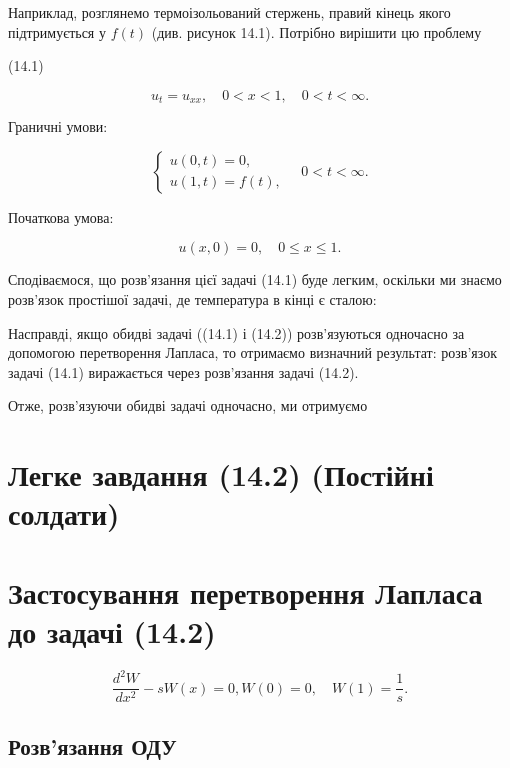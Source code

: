 \documentclass[
  ukrainian,
]{article}
\begin{document}
Наприклад, розглянемо термоізольований стержень, правий кінець якого
підтримується у \(f(t)\) (див. рисунок 14.1). Потрібно вирішити цю
проблему

(14.1)

\[
u_t = u_{xx}, \quad 0 < x < 1, \quad 0 < t < \infty.
\]

Граничні умови:

\[
\begin{cases}
u(0, t) = 0, \\
u(1, t) = f(t),
\end{cases}
\quad 0 < t < \infty.
\]

Початкова умова:

\[
u(x, 0) = 0, \quad 0 \le x \le 1.
\]

Сподіваємося, що розв'язання цієї задачі (14.1) буде легким, оскільки ми
знаємо розв'язок простішої задачі, де температура в кінці є сталою:

Насправді, якщо обидві задачі ((14.1) і (14.2)) розв'язуються одночасно
за допомогою перетворення Лапласа, то отримаємо визначний результат:
розв'язок задачі (14.1) виражається через розв'язання задачі (14.2).

Отже, розв'язуючи обидві задачі одночасно, ми отримуємо

\section{Легке завдання (14.2) (Постійні
солдати)}\label{ux43bux435ux433ux43aux435-ux437ux430ux432ux434ux430ux43dux43dux44f-14.2-ux43fux43eux441ux442ux456ux439ux43dux456-ux441ux43eux43bux434ux430ux442ux438}

\section{Застосування перетворення Лапласа до задачі
(14.2)}\label{ux437ux430ux441ux442ux43eux441ux443ux432ux430ux43dux43dux44f-ux43fux435ux440ux435ux442ux432ux43eux440ux435ux43dux43dux44f-ux43bux430ux43fux43bux430ux441ux430-ux434ux43e-ux437ux430ux434ux430ux447ux456-14.2}

\[
\frac{d^2 W}{dx^2} - s W(x) = 0,
W(0) = 0, \quad W(1) = \frac{1}{s}.
\]

\subsection{Розв'язання
ОДУ}\label{ux440ux43eux437ux432ux44fux437ux430ux43dux43dux44f-ux43eux434ux443}
\end{document}
